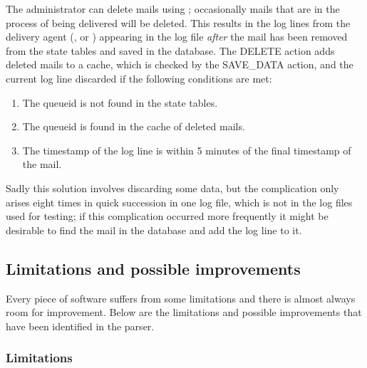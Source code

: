 \label{Mails deleted during delivery}

The administrator can delete mails using ; occasionally
mails that are in the process of being delivered will be deleted.  This
results in the log lines from the delivery agent (,
 or ) appearing in the log file
\textit{after\/} the mail has been removed from the state tables and saved
in the database.  The DELETE action adds deleted mails to a cache, which is
checked by the SAVE\_DATA action, and the current log line discarded if the
following conditions are met:

\begin{enumerate}

    \item The queueid is not found in the state tables. 

    \item The queueid is found in the cache of deleted mails.

    \item The timestamp of the log line is within 5 minutes of the final
        timestamp of the mail.

\end{enumerate}

Sadly this solution involves discarding some data, but the complication
only arises eight times in quick succession in one log file, which is not
in the \numberOFlogFILES{} log files used for testing; if this complication
occurred more frequently it might be desirable to find the mail in the
database and add the log line to it.

\subsection{Limitations and possible improvements}

\label{limitations-improvements}

Every piece of software suffers from some limitations and there is almost
always room for improvement.  Below are the limitations and possible
improvements that have been identified in the parser.

\subsubsection{Limitations}

\label{logging helo}

